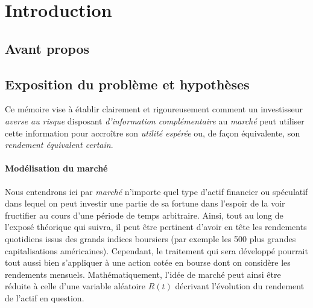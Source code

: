 \section{Introduction}


\subsection{Avant propos}



\subsection{Exposition du problème et hypothèses}

Ce mémoire vise à établir clairement et rigoureusement comment un investisseur
\textit{averse au risque} disposant \textit{d'information complémentaire} au
\textit{marché} peut utiliser cette information pour accroître son \textit{utilité
  espérée} ou, de façon équivalente, son \textit{rendement équivalent certain}.

\paragraph{Modélisation du marché}

Nous entendrons ici par \textit{marché} n'importe quel type d'actif financier ou
spéculatif dans lequel on peut investir une partie de sa fortune dans l'espoir de la voir
fructifier au cours d'une période de temps arbitraire. Ainsi, tout au long de l'exposé
théorique qui suivra, il peut être pertinent d'avoir en tête les rendements quotidiens
issus des grands indices boursiers (par exemple les 500 plus grandes capitalisations
américaines). Cependant, le traitement qui sera développé pourrait tout aussi bien
s'appliquer à une action cotée en bourse dont on considère les rendements mensuels.\nec
Mathématiquement, l'idée de marché peut ainsi être réduite à celle d'une variable
aléatoire $R(t)$ décrivant l'évolution du rendement de l'actif en question.

